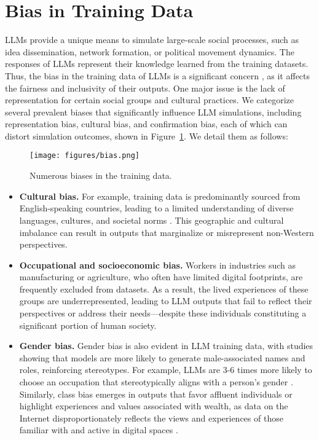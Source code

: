 \section{Bias in Training Data}\label{sec:bias}
LLMs provide a unique means to simulate large-scale social processes, such as idea dissemination, network formation, or political movement dynamics. The responses of LLMs represent their knowledge learned from the training datasets. Thus, the bias in the training data of LLMs is a significant concern \citep{lee2024life}, as it affects the fairness and inclusivity of their outputs. One major issue is the lack of representation for certain social groups and cultural practices. We categorize several prevalent biases that significantly influence LLM simulations, including representation bias, cultural bias, and confirmation bias, each of which can distort simulation outcomes, shown in Figure~\ref{fig:bias}. We detail them as follows: 

\begin{figure}[htbp]
  \centering
  \texttt{[image: figures/bias.png]}
  \caption{Numerous biases in the training data.}
  \label{fig:bias}
\end{figure}

\begin{itemize}
  \item \textbf{Cultural bias.} For example, training data is predominantly sourced from English-speaking countries, leading to a limited understanding of diverse languages, cultures, and societal norms \citep{wang2023not}. This geographic and cultural imbalance can result in outputs that marginalize or misrepresent non-Western perspectives.
  
  \item \textbf{Occupational and socioeconomic bias.} Workers in industries such as manufacturing or agriculture, who often have limited digital footprints, are frequently excluded from datasets. As a result, the lived experiences of these groups are underrepresented, leading to LLM outputs that fail to reflect their perspectives or address their needs—despite these individuals constituting a significant portion of human society.
  
  \item \textbf{Gender bias.} Gender bias is also evident in LLM training data, with studies showing that models are more likely to generate male-associated names and roles, reinforcing stereotypes. For example, LLMs are 3-6 times more likely to choose an occupation that stereotypically aligns with a person’s gender \citep{kotek2023gender}. Similarly, class bias emerges in outputs that favor affluent individuals or highlight experiences and values associated with wealth, as data on the Internet disproportionately reflects the views and experiences of those familiar with and active in digital spaces \citep{dai2024bias}.
\end{itemize}

